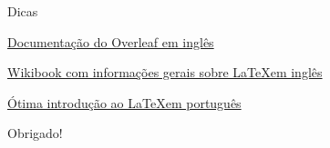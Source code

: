 \documentclass[aspectratio=169,xcolor=dvipsnames]{beamer}
\begin{document}
\begin{frame}{Dicas}

    \href{https://pt.overleaf.com/learn}{Documentação do Overleaf em inglês}
    
    
    \href{https://en.wikibooks.org/wiki/LaTeX/Document_Structure}{Wikibook com informações gerais sobre \LaTeX em inglês}
    
    \href{https://wp.ufpel.edu.br/nuclear/files/2017/04/intlatex.pdf}{Ótima introdução ao \LaTeX em português}

    
\end{frame}

\begin{frame}
    \Huge{\centerline{Obrigado!}} 
\end{frame}
\end{document}
